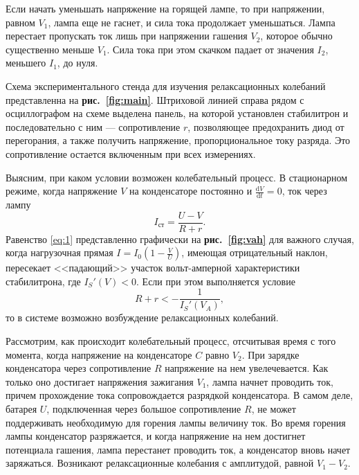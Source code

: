 \documentclass[a4paper, 12pt]{article}
\begin{document}
Если начать уменьшать напряжение на горящей лампе, то при напряжении, равном
$V_1$, лампа еще не гаснет, и сила тока продолжает уменьшаться. Лампа перестает
пропускать ток лишь при напряжении гашения $V_2$, которое обычно существенно
меньше $V_1$. Сила тока при этом скачком падает от значения $I_2$, меньшего
$I_1$, до нуля.

Схема экспериментального стенда для изучения релаксационных колебаний
представленна на \textbf{рис.~\ref{fig:main}}. Штриховой линией справа рядом с
осциллографом на схеме выделена панель, на которой установлен стабилитрон и
последовательно с ним --- сопротивление $r$, позволяющее предохранить диод от
перегорания, а также получить напряжение, пропорциональное току разряда. Это
сопротивление остается включенным при всех измерениях.

Выясним, при каком условии возможен колебательный процесс. В стационарном режиме, когда напряжение $V$ на конденсаторе постоянно и $\frac{\mathrm{d}V}{\mathrm{d}t } = 0$, ток через лампу
\begin{equation}
\label{eq:1}
I_{ст} = \frac{ U-V }{ R+r}.
\end{equation}
Равенство \eqref{eq:1} представленно графически на \textbf{рис.~\ref{fig:vah}}
для важного случая, когда нагрузочная прямая
$I=I_0 \left( 1-\frac{ V }{ U} \right)$, имеющая отрицательный наклон, пересекает <<падающий>>
участок вольт-амперной характеристики стабилитрона, где
$I_S' \left( V \right)<0$. Если при этом выполняется условие
\begin{equation}
\label{eq:2}
R+r<-\frac{ 1 }{ I_S' \left( V_A \right)},
\end{equation}
то в системе возможно возбуждение релаксационных колебаний.

Рассмотрим, как происходит колебательный процесс, отсчитывая время с того
момента, когда напряжение на конденсаторе $C$ равно $V_2$. При зарядке
конденсатора через сопротивление $R$ напряжение на нем увелечевается. Как только
оно достигает напряжения зажигания $V_1$, лампа начнет проводить ток, причем
прохождение тока сопровождается разрядкой конденсатора. В самом деле, батарея
$U$, подключенная через большое сопротивление $R$, не может поддерживать
необходимую для горения лампы величину ток. Во время горения лампы конденсатор
разряжается, и когда напряжение на нем достигнет потенциала гашения, лампа
перестанет проводить ток, а конденсатор вновь начет заряжаться. Возникают
релаксационные колебания с амплитудой, равной $V_1-V_2$.
\end{document}
